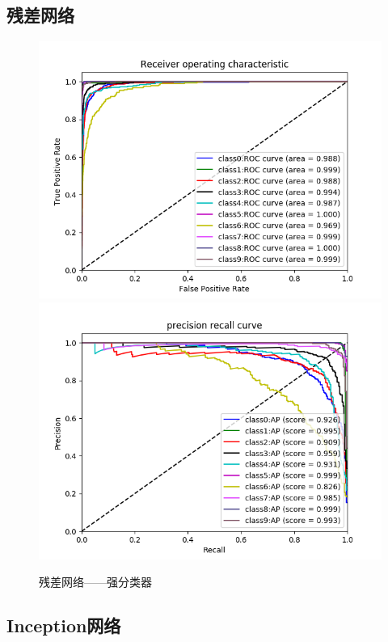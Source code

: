 \documentclass[UTF8]{ctexart}
\begin{document}
\subsection{残差网络}\label{resnet}
\begin{figure}[H]
    \centering
    \includegraphics[scale=0.35]{../images/weightresroc.png}
    \includegraphics[scale=0.35]{../images/weightrespro.png}
    \caption{残差网络——强分类器}
\end{figure}

\subsection{Inception网络}
\end{document}
